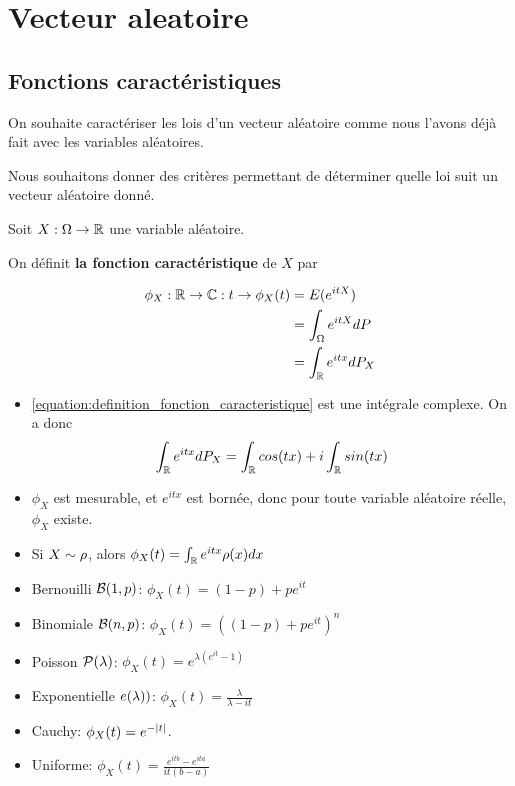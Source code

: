 \chapter{Vecteur aleatoire}

\section{Fonctions caractéristiques}

On souhaite caractériser les lois d'un vecteur aléatoire comme nous l'avons déjà
fait avec les variables aléatoires.

Nous souhaitons donner des critères permettant de déterminer quelle loi suit un
vecteur aléatoire donné.

\begin{definition}
	Soit $X : \Omega \rightarrow \mathbb{R}$ une variable aléatoire.

	On définit \textbf{la fonction caractéristique} de $X$ par

	\begin{align}
		\phi_{X} : \mathbb{R} \rightarrow \mathbb{C} : t \rightarrow
		\phi_{X}(t) & = E(e^{i t X}) \\
		& = \int_{\Omega} e^{it X} dP \\
		& = \int_{\mathbb{R}} e^{it x} dP_{X}
		\label{equation:definition_fonction_caracteristique}
	\end{align}
\end{definition}

\begin{remarque}
	\begin{itemize}
		\item \ref{equation:definition_fonction_caracteristique} est une
			intégrale complexe. On a donc
			\begin{equation}
				\int_{\mathbb{R}}e^{itx} dP_{X} = \int_{\mathbb{R}}cos(tx) + i
				\int_{\mathbb{R}} sin(tx)
			\end{equation}
		\item $\phi_{X}$ est mesurable, et $e^{itx}$ est bornée, donc pour toute
			variable aléatoire réelle, $\phi_{X}$ existe.
		\item Si $X \sim \rho$, alors $\phi_{X}(t) = \int_{\mathbb{R}} e^{itx}
			\rho(x) dx$
	\end{itemize}
\end{remarque}

\begin{exemple}
	\begin{itemize}
		\item Bernouilli $\mathcal{B}(1, p)$: $\phi_{X}(t) = (1 - p) + p e^{it}$
		\item Binomiale $\mathcal{B}(n, p)$: $\phi_{X}(t) = ( (1 - p) + p e^{it})^{n}$
		\item Poisson $\mathcal{P}(\lambda)$: $\phi_{X}(t) = e^{\lambda (e^{it} - 1)}$
		\item Exponentielle $e(\lambda))$: $\phi_{X}(t) = \frac{\lambda}{\lambda
			- it}$
		\item Cauchy: $\phi_{X}(t) = e^{-\abs{t}}$.
		\item Uniforme: $\phi_{X}(t) = \frac{e^{itb} - e^{ita}}{it (b - a)}$
	\end{itemize}
\end{exemple}

